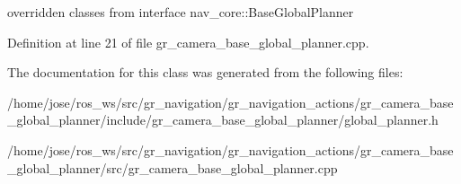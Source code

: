 overridden classes from interface nav\+\_\+core\+::\+Base\+Global\+Planner 

Definition at line 21 of file gr\+\_\+camera\+\_\+base\+\_\+global\+\_\+planner.\+cpp.



The documentation for this class was generated from the following files\+:\begin{DoxyCompactItemize}
\item 
/home/jose/ros\+\_\+ws/src/gr\+\_\+navigation/gr\+\_\+navigation\+\_\+actions/gr\+\_\+camera\+\_\+base\+\_\+global\+\_\+planner/include/gr\+\_\+camera\+\_\+base\+\_\+global\+\_\+planner/global\+\_\+planner.\+h\item 
/home/jose/ros\+\_\+ws/src/gr\+\_\+navigation/gr\+\_\+navigation\+\_\+actions/gr\+\_\+camera\+\_\+base\+\_\+global\+\_\+planner/src/gr\+\_\+camera\+\_\+base\+\_\+global\+\_\+planner.\+cpp\end{DoxyCompactItemize}
